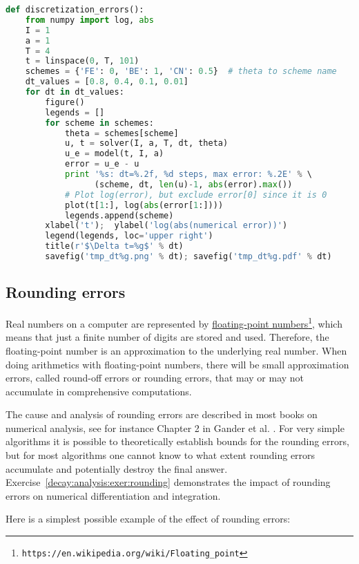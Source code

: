 \documentclass[graybox,sectrefs,envcountresetchap,open=right,final]{svmonodo}
\begin{document}
\begin{lstlisting}[language=Python,style=blue1_bluegreen]
def discretization_errors():
    from numpy import log, abs
    I = 1
    a = 1
    T = 4
    t = linspace(0, T, 101)
    schemes = {'FE': 0, 'BE': 1, 'CN': 0.5}  # theta to scheme name
    dt_values = [0.8, 0.4, 0.1, 0.01]
    for dt in dt_values:
        figure()
        legends = []
        for scheme in schemes:
            theta = schemes[scheme]
            u, t = solver(I, a, T, dt, theta)
            u_e = model(t, I, a)
            error = u_e - u
            print '%s: dt=%.2f, %d steps, max error: %.2E' % \ 
                  (scheme, dt, len(u)-1, abs(error).max())
            # Plot log(error), but exclude error[0] since it is 0
            plot(t[1:], log(abs(error[1:])))
            legends.append(scheme)
        xlabel('t');  ylabel('log(abs(numerical error))')
        legend(legends, loc='upper right')
        title(r'$\Delta t=%g$' % dt)
        savefig('tmp_dt%g.png' % dt); savefig('tmp_dt%g.pdf' % dt)
\end{lstlisting}

\subsection{Rounding errors}

Real numbers on a computer are represented by \href{{https://en.wikipedia.org/wiki/Floating_point}}{floating-point
numbers}\footnote{\texttt{https://en.wikipedia.org/wiki/Floating\_point}}, which means
that just a finite number of digits are stored and used. Therefore,
the floating-point number is an approximation to the underlying real
number. When doing arithmetics with floating-point numbers, there will
be small approximation errors, called round-off errors or rounding
errors, that may or may not accumulate in comprehensive computations.

The cause and analysis of rounding errors are described in most books
on numerical analysis, see for instance Chapter 2 in Gander et
al. \cite{Gander_2015}. For very simple algorithms it is possible to
theoretically establish bounds for the rounding errors, but for most
algorithms one cannot know to what extent rounding errors accumulate
and potentially destroy the final answer. Exercise~\ref{decay:analysis:exer:rounding} demonstrates the impact of rounding
errors on numerical differentiation and integration.

Here is a simplest possible example of the effect of rounding
errors:
\end{document}
